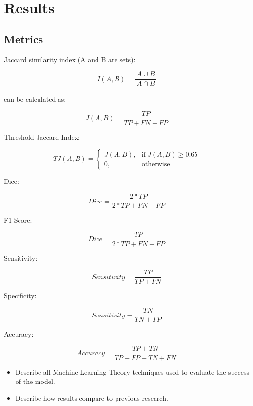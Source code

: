 \section{Results}

\subsection{Metrics}

Jaccard similarity index (A and B are sets):

\begin{equation}
  J(A, B) = \frac{|A \cup B|}{|A \cap B|}
\end{equation}

can be calculated as:

\begin{equation}
  J(A, B) = \frac{TP}{TP + FN + FP}
\end{equation}

Threshold Jaccard Index:

\begin{equation}
  TJ(A, B) = \begin{cases}
      J(A, B), & \text{if}\ J(A, B) \geq{0.65} \\
      0, & \text{otherwise}
    \end{cases}
\end{equation}

Dice:

\begin{equation}
  Dice = \frac{2 * TP}{2 * TP + FN + FP}
\end{equation}

F1-Score:

\begin{equation}
  Dice = \frac{TP}{2 * TP + FN + FP}
\end{equation}

Sensitivity:

\begin{equation}
  Sensitivity = \frac{TP}{TP + FN}
\end{equation}

Specificity:

\begin{equation}
  Sensitivity = \frac{TN}{TN + FP}
\end{equation}

Accuracy:

\begin{equation}
  Accuracy = \frac{TP + TN}{TP + FP + TN + FN}
\end{equation}


\begin{itemize}
  \item Describe all Machine Learning Theory techniques used to evaluate the success of the model.
  \item Describe how results compare to previous research.
\end{itemize}
